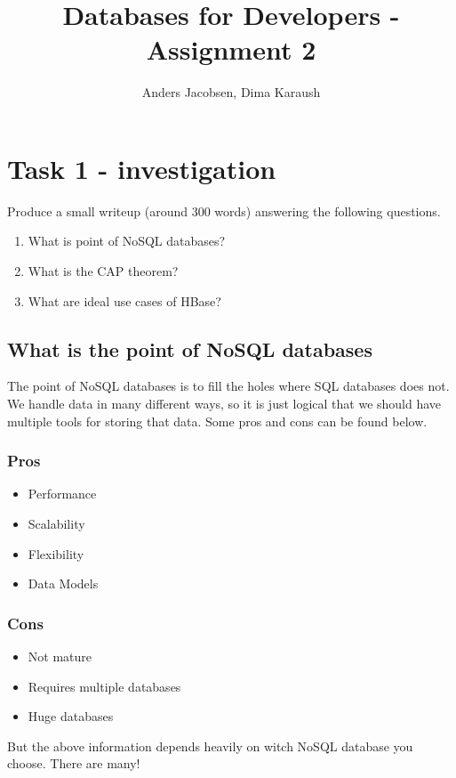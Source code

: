 \documentclass{article}
\title{Databases for Developers - Assignment 2}
\author{Anders Jacobsen, Dima Karaush}
\begin{document}
\maketitle

\newpage

\section{Task 1 - investigation}
Produce a small writeup (around 300 words) answering the following questions.
\begin{enumerate}
\item What is point of NoSQL databases?
\item What is the CAP theorem?
\item What are ideal use cases of HBase?
\end{enumerate}

\subsection{What is the point of NoSQL databases}
The point of NoSQL databases is to fill the holes where SQL databases does not. 
We handle data in many different ways, so it is just logical that we should have 
multiple tools for storing that data. Some pros and cons can be found below. 
\subsubsection*{Pros}
\begin{itemize}
    \item Performance
    \item Scalability
    \item Flexibility
    \item Data Models
\end{itemize}

\subsubsection*{Cons}
\begin{itemize}
    \item Not mature
    \item Requires multiple databases
    \item Huge databases
\end{itemize}

But the above information depends heavily on witch NoSQL database you choose. There are many!
\end{document}

